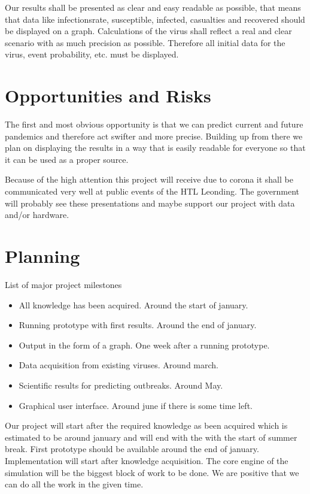 \documentclass[12pt]{article}
\theoremstyle{definition}
\begin{document}
Our results shall be presented as clear and easy readable as possible, 
that means that data like infectionsrate, susceptible, infected, casualties and recovered should be displayed on a graph.
Calculations of the virus shall reflect a real and clear scenario with as much precision as possible.
Therefore all initial data for the virus, event probability, etc. must be displayed.

\pagebreak
\section{Opportunities and Risks}

The first and most obvious opportunity is that we can predict current and future pandemics and therefore act swifter and more precise.
Building up from there we plan on displaying the results in a way that is easily readable for everyone so that it can be used as a proper source.

Because of the high attention this project will receive due to corona it shall be communicated very well at public events of the HTL Leonding.
The government will probably see these presentations and maybe support our project with data and/or hardware.



\pagebreak
\section{Planning}

List of major project milestones
\begin{itemize}
\item All knowledge has been acquired. Around the start of january.
\item Running prototype with first results. Around the end of january.
\item Output in the form of a graph. One week after a running prototype.
\item Data acquisition from existing viruses. Around march.
\item Scientific results for predicting outbreaks. Around May.
\item Graphical user interface. Around june if there is some time left.
\end{itemize}

Our project will start after the required knowledge as been acquired which is estimated to be around january and will end with the with the start of summer break.
First prototype should be available around the end of january.
Implementation will start after knowledge acquisition.
The core engine of the simulation will be the biggest block of work to be done.
We are positive that we can do all the work in the given time.
\end{document}
